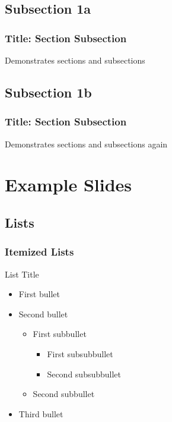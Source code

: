 \subsection{Subsection 1a}\label{Sub1a}



\begin{frame}\frametitle{Title: Section \thesection Subsection \thesubsection}
Demonstrates sections and subsections
\end{frame}

\subsection{Subsection 1b}

\begin{frame}\frametitle{Title: Section \thesection Subsection \thesubsection}
  Demonstrates sections and subsections again
\end{frame}

\section{Example Slides}



\subsection{Lists}


\begin{frame}\frametitle{Itemized Lists}

List Title
\begin{itemize}
    \item First bullet
    \item Second bullet
    \begin{itemize}
        \item First subbullet
        \begin{itemize}
            \item First subsubbullet
            \item Second subsubbullet
        \end{itemize}
        \item Second subbullet
    \end{itemize}
    \item Third bullet
\end{itemize}
\end{frame}



